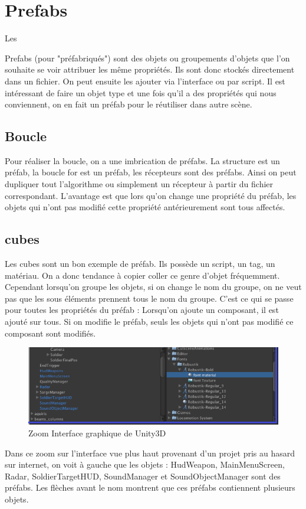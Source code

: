 \documentclass[a4paper,11pt]{myreport}
\begin{document}
	\section{Prefabs}
	\par \hypertarget{prefabTarget}{Les} Prefabs (pour "préfabriqués") sont des objets ou groupements d'objets que l'on souhaite se voir attribuer les même propriétés. Ils sont donc stockés directement dans un fichier. On peut ensuite les ajouter via l'interface ou par script. Il est intéressant de faire un objet type et une fois qu'il a des propriétés qui nous conviennent, on en fait un préfab pour le réutiliser dans autre scène.
	
	\subsection{Boucle}
	\par Pour réaliser la boucle, on a une imbrication de préfabs. La structure est un préfab, la boucle for est un préfab, les récepteurs sont des préfabs. Ainsi on peut dupliquer tout l'algorithme ou simplement un récepteur à partir du fichier correspondant. L'avantage est que lors qu'on change une propriété du préfab, les objets qui n'ont pas modifié cette propriété antérieurement sont tous affectés.
	\subsection{cubes}
	\par Les cubes sont un bon exemple de préfab. Ils possède un script, un tag, un matériau. On a donc tendance à copier coller ce genre d'objet fréquemment. Cependant lorsqu'on groupe les objets, si on change le nom du groupe, on ne veut pas que les sous éléments prennent tous le nom du groupe. C'est ce qui se passe pour toutes les propriétés du préfab : Lorsqu'on ajoute un composant, il est ajouté sur tous. Si on modifie le préfab, seuls les objets qui n'ont pas modifié ce composant sont modifiés.
	\begin{figure}[h]
	\includegraphics[scale=0.90]{./images/unity-3D_interface_zoom.png}
	\caption{Zoom Interface graphique de Unity3D}
	\end{figure}
	\par Dans ce zoom sur l'interface vue plus haut provenant d'un projet pris au hasard sur internet, on voit à gauche que les objets : HudWeapon, MainMenuScreen, Radar, SoldierTargetHUD, SoundManager et SoundObjectManager sont des préfabs. Les flèches avant le nom montrent que ces préfabs contiennent plusieurs objets.
	
\end{document}
